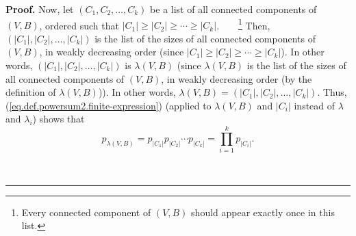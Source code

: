\documentclass[numbers=enddot,12pt,final,onecolumn,notitlepage]{scrartcl}%
\theoremstyle{definition}
\newenvironment{proof}[1][Proof]{\noindent\textbf{#1.} }{\ \rule{0.5em}{0.5em}}
\newenvironment{verlong}{}{}
\let\prodnonlimits\prod
\renewcommand{\prod}{\prodnonlimits\limits}
\begin{document}
\begin{verlong}
\begin{proof}
Now, let $\left(  C_{1},C_{2},\ldots,C_{k}\right)  $ be a list of all
connected components of $\left(  V,B\right)  $, ordered such that $\left\vert
C_{1}\right\vert \geq\left\vert C_{2}\right\vert \geq\cdots\geq\left\vert
C_{k}\right\vert $.\ \ \ \ \footnote{Every connected component of $\left(
V,B\right)  $ should appear exactly once in this list.} Then, $\left(
\left\vert C_{1}\right\vert ,\left\vert C_{2}\right\vert ,\ldots,\left\vert
C_{k}\right\vert \right)  $ is the list of the sizes of all connected
components of $\left(  V,B\right)  $, in weakly decreasing order (since
$\left\vert C_{1}\right\vert \geq\left\vert C_{2}\right\vert \geq\cdots
\geq\left\vert C_{k}\right\vert $). In other words, $\left(  \left\vert
C_{1}\right\vert ,\left\vert C_{2}\right\vert ,\ldots,\left\vert
C_{k}\right\vert \right)  $ is $\lambda\left(  V,B\right)  $ (since
$\lambda\left(  V,B\right)  $ is the list of the sizes of all connected
components of $\left(  V,B\right)  $, in weakly decreasing order (by the
definition of $\lambda\left(  V,B\right)  $)). In other words, $\lambda\left(
V,B\right)  =\left(  \left\vert C_{1}\right\vert ,\left\vert C_{2}\right\vert
,\ldots,\left\vert C_{k}\right\vert \right)  $. Thus,
(\ref{eq.def.powersum2.finite-expression}) (applied to $\lambda\left(
V,B\right)  $ and $\left\vert C_{i}\right\vert $ instead of $\lambda$ and
$\lambda_{i}$) shows that{}%
\begin{equation}
p_{\lambda\left(  V,B\right)  }=p_{\left\vert C_{1}\right\vert }p_{\left\vert
C_{2}\right\vert }\cdots p_{\left\vert C_{k}\right\vert }=\prod_{i=1}%
^{k}p_{\left\vert C_{i}\right\vert }. \label{pf.lem.Eqs.sum.p1}%
\end{equation}



\end{proof}
\end{verlong}
\end{document}

